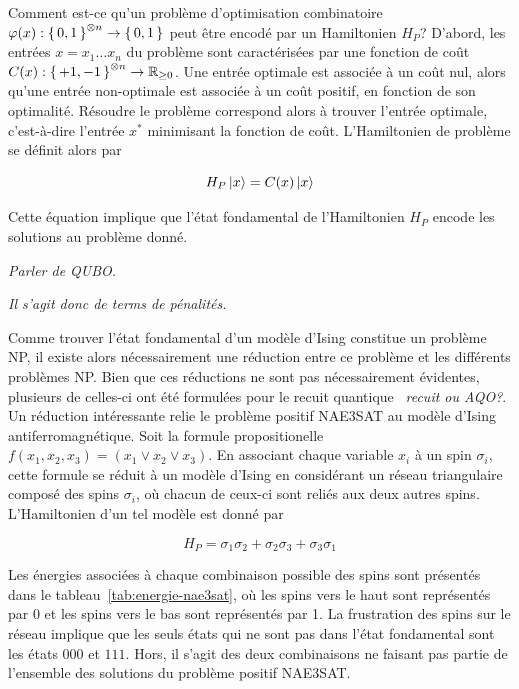 Comment est-ce qu'un problème d'optimisation combinatoire $\varphi(x):\set{ 0, 1 }^{\otimes n} \to \set{ 0, 1 }$ peut être encodé par un Hamiltonien $H_{P}$? D'abord, les entrées $x = x_{1} \dots x_{n}$ du problème sont caractérisées par une fonction de coût $C(x):\set{ +1, -1 }^{\otimes n} \to \mathbb{R}_{\geq 0}$. Une entrée optimale est associée à un coût nul, alors qu'une entrée non-optimale est associée à un coût positif, en fonction de son optimalité. Résoudre le problème correspond alors à trouver l'entrée optimale, c'est-à-dire l'entrée $x^{*}$ minimisant la fonction de coût. L'Hamiltonien de problème se définit alors par

\begin{equation}
    H_{P} \ket{x} = C(x) \ket{x}
\end{equation}

Cette équation implique que l'état fondamental de l'Hamiltonien $H_{P}$ encode les solutions au problème donné. 

\textcolor{mydarkred}{\textit{Parler de QUBO.}}

\textcolor{mydarkred}{\textit{Il s'agit donc de terms de pénalités.}}


Comme trouver l'état fondamental d'un modèle d'Ising constitue un problème NP, il existe alors nécessairement une réduction entre ce problème et les différents problèmes NP. Bien que ces réductions ne sont pas nécessairement évidentes, plusieurs de celles-ci ont été formulées pour le recuit quantique~\cite{lucasIsingFormulationsMany2014,lodewijksMappingNPhardNPcomplete2020} \textcolor{mydarkred}{\textit{recuit ou AQO?}}. Un réduction intéressante relie le problème positif NAE3SAT au modèle d'Ising antiferromagnétique. Soit la formule propositionelle $f(x_{1}, x_{2}, x_{3}) = (x_{1} \lor x_{2} \lor x_{3})$. En associant chaque variable $x_{i}$ à un spin $\sigma_{i}$, cette formule se réduit à un modèle d'Ising en considérant un réseau triangulaire composé des spins $\sigma_{i}$, où chacun de ceux-ci sont reliés aux deux autres spins. L'Hamiltonien d'un tel modèle est donné par

\begin{equation}
    H_{P} = \sigma_{1}\sigma_{2} + \sigma_{2}\sigma_{3} + \sigma_{3}\sigma_{1}
\end{equation}

Les énergies associées à chaque combinaison possible des spins sont présentés dans le tableau~\ref{tab:energie-nae3sat}, où les spins vers le haut sont représentés par 0 et les spins vers le bas sont représentés par 1. La frustration des spins sur le réseau implique que les seuls états qui ne sont pas dans l'état fondamental sont les états $000$ et $111$. Hors, il s'agit des deux combinaisons ne faisant pas partie de l'ensemble des solutions du problème positif NAE3SAT.


